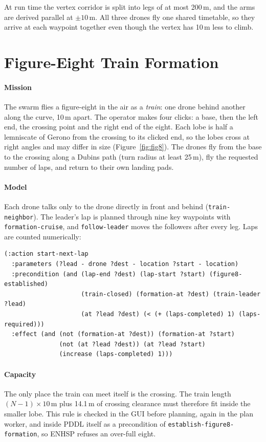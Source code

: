 \documentclass[11pt,a4paper,oneside]{report}
\newcommand{\code}[1]{\texttt{#1}}
\begin{document}
\noindent At run time the vertex corridor is split into legs of at most 200\,m, and the arms are
derived parallel at $\pm10$\,m. All three drones fly one shared timetable, so they arrive at each
waypoint together even though the vertex has 10\,m less to climb.

\section{Figure-Eight Train Formation}
\paragraph{Mission}
The swarm flies a figure-eight in the air as a \emph{train}: one drone behind another along the
curve, 10\,m apart. The operator makes four clicks: a base, then the left end, the crossing point
and the right end of the eight. Each lobe is half a lemniscate of Gerono from the crossing to its
clicked end, so the lobes cross at right angles and may differ in size (Figure~\ref{fig:fig8}).
The drones fly from the base to the crossing along a Dubins path (turn radius at least 25\,m),
fly the requested number of laps, and return to their own landing pads.

\paragraph{Model}
Each drone talks only to the drone directly in front and behind (\code{train-neighbor}). The
leader's lap is planned through nine key waypoints with \code{formation-cruise}, and
\code{follow-leader} moves the followers after every leg. Laps are counted numerically:

\begin{lstlisting}
(:action start-next-lap
  :parameters (?lead - drone ?dest - location ?start - location)
  :precondition (and (lap-end ?dest) (lap-start ?start) (figure8-established)
                     (train-closed) (formation-at ?dest) (train-leader ?lead)
                     (at ?lead ?dest) (< (+ (laps-completed) 1) (laps-required)))
  :effect (and (not (formation-at ?dest)) (formation-at ?start)
               (not (at ?lead ?dest)) (at ?lead ?start)
               (increase (laps-completed) 1)))
\end{lstlisting}

\paragraph{Capacity}
The only place the train can meet itself is the crossing. The train length $(N-1)\times10$\,m
plus 14.1\,m of crossing clearance must therefore fit inside the smaller lobe. This rule is
checked in the GUI before planning, again in the plan worker, and inside PDDL itself as a
precondition of \code{establish-figure8-formation}, so ENHSP refuses an over-full eight.
\end{document}
